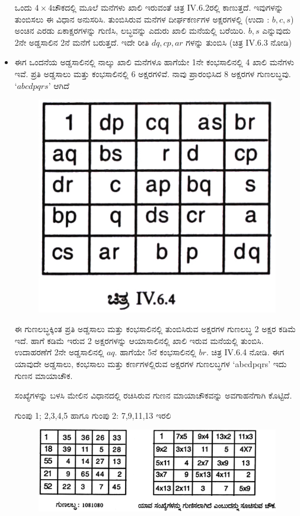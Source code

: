 \begin{itemize}
	ಒಂದು $4 \times 4$ಚೌಕದಲ್ಲಿ ಮೂಲೆ ಮನೆಗಳು ಖಾಲಿ ಇರುವಂತೆ ಚಿತ್ರ IV.6.2ರಲ್ಲಿ ಕಾಣು\-ತ್ತದೆ. ಇವುಗಳನ್ನು ತುಂಬಿಸಲು ಈ ವಿಧಾನ ಅನುಸರಿಸಿ. ತುಂಬಿಸಿರುವ ಮನೆಗಳ ದೀರ್ಘಕರ್ಣಗಳ ಅಕ್ಷರಗಳಲ್ಲಿ (ಉದಾ : $b, c, s$) ಅಂಚಿನ ಎರಡು ಏಕಾಕ್ಷರ\-ಗಳನ್ನು ಗುಣಿಸಿ, ಲಬ್ಧವನ್ನು ಎದುರು ಖಾಲಿ ಮನೆಯಲ್ಲಿ ಬರೆಯಿರಿ. $b, s$ ಎನ್ನುವುದು 2ನೇ ಅಡ್ಡಸಾಲಿನ 2ನೆ ಮನೆಗೆ ಬರುತ್ತದೆ. ಇದೇ ರೀತಿ $dq, cp, ar$ ಗಳನ್ನು ತುಂಬಿಸಿ (ಚಿತ್ರ IV.6.3 ನೋಡಿ)
	\item ಈಗ ಒಂದನೆಯ ಅಡ್ಡಸಾಲಿನಲ್ಲಿ ನಾಲ್ಕು ಖಾಲಿ ಮನೆಗಳೂ ಹಾಗೆಯೇ 1ನೇ ಕಂಭ\break ಸಾಲಿನಲ್ಲಿ 4 ಖಾಲಿ ಮನೆಗಳು ಇವೆ. ಪ್ರತಿ ಅಡ್ಡಸಾಲು ಮತ್ತು ಕಂಭಸಾಲಿನಲ್ಲಿ 6 ಅಕ್ಷರ\-ಗಳಿವೆ. ನಾವು ಪ್ರಾರಂಭಿಸಿದ 8 ಅಕ್ಷರಗಳ ಗುಣಲಬ್ಧವು. $‘abcdpqrs’$ ಆಗಿದೆ
	\begin{figure}[H]
	\includegraphics{src/figures/chap7/fig7-29.jpg}
	\end{figure}

	ಈ ಗುಣಲಬ್ಧಕ್ಕಿಂತ ಪ್ರತಿ ಅಡ್ಡಸಾಲು ಮತ್ತು ಕಂಭಸಾಲಿನಲ್ಲಿ ತುಂಬಿಸಿರುವ ಅಕ್ಷರಗಳ ಗುಣಲಬ್ಧ 2 ಅಕ್ಷರ ಕಡಿಮೆ ಇದೆ. ಹಾಗೆ ಕಡಿಮೆ ಇರುವ 2 ಅಕ್ಷರಗಳನ್ನು ಆಯಾಸಾಲಿನಲ್ಲಿ ಖಾಲಿ ಇರುವ ಮನೆಯಲ್ಲಿ ತುಂಬಿಸಿ. ಉದಾಹರಣೆಗೆ 2ನೇ ಅಡ್ಡಸಾಲಿನಲ್ಲಿ $aq$. ಹಾಗೆಯೇ 5ನೆ ಕಂಭಸಾಲಿನಲ್ಲಿ $br$. ಚಿತ್ರ IV.6.4 ನೋಡಿ. ಈಗ ಯಾವುದೇ ಅಡ್ಡಸಾಲು, ಕಂಭಸಾಲು ಮತ್ತು ಕರ್ಣಗಳಲ್ಲಿರುವ ಅಕ್ಷರಗಳ ಗುಣಲಬ್ಧಗಳ `abcdpqrs’ ಇದು ಗುಣನ ಮಾಯಾಚೌಕ.

	ಸಂಖ್ಯೆಗಳನ್ನು ಬಳಸಿ ಮೇಲಿನ ವಿಧಾನದಲ್ಲಿ ರಚಿಸಿರುವ ಗುಣನ ಮಾಯಾಚೌಕವನ್ನು ಅವಗಾಹನೆಗಾಗಿ ಕೊಟ್ಟಿದೆ.

	ಗುಂಪು 1; 2,3,4,5 ಹಾಗೂ ಗುಂಪು 2: 7,9,11,13 ಇರಲಿ
	\begin{figure}[H]
	\includegraphics{src/figures/chap7/fig7-30.jpg}
	\end{figure}
\end{itemize}


